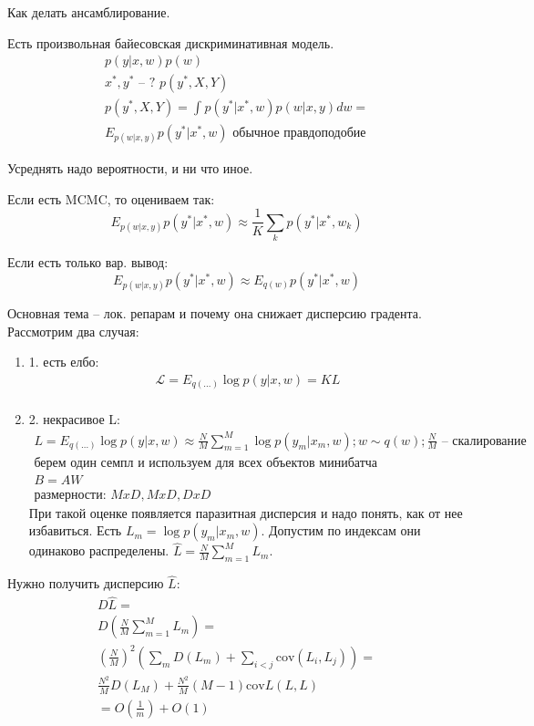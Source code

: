 \documentclass{minimal}
\begin{document}
Как делать ансамблирование.

Есть произвольная байесовская дискриминативная модель.
\begin{gather*}
  p(y|x, w)p(w)\\
  x^*, y^* \textrm{ -- ? } p(y^*, X, Y)\\
  p(y^*, X, Y) = \int_{}^{} {p(y^*|x^*,w)p(w|x,y)dw}=\\
  E_{p(w|x, y)} p(y^*|x^*,w) \textrm{ обычное правдоподобие}
\end{gather*}

Усреднять надо вероятности, и ни что иное.

Если есть MCMC, то оцениваем так:
\[
  E_{p(w|x, y)} p(y^*|x^*,w) \approx \frac{1}{K}\sum_{k}^{} {p(y^*|x^*,w_k)}
\]

Если есть только вар. вывод:
\[
  E_{p(w|x, y)} p(y^*|x^*,w) \approx E_{q(w)} {p(y^*|x^*,w)}
\]

Основная тема -- лок. репарам и почему она снижает дисперсию градента.
Рассмотрим два случая:

\begin{enumerate}
  \item 1. есть елбо:
\begin{gather*}
  \mathcal{L}=E_{q(\dots)} \log p(y|x, w)=KL\\
\end{gather*}
\item 2. некрасивое L:
\begin{gather*}
  L=E_{q(\dots)} \log p(y|x, w) \approx \frac{N}{M} \sum_{m=1}^{M} {\log p(y_m|x_m,w)}; w \sim q(w); \textrm{$\frac{N}{M}$ -- скалирование}\\
  \textrm{берем один семпл и используем для всех объектов минибатча}\\
  B=AW\\
  \textrm{размерности: }MxD, MxD, DxD
\end{gather*}
При такой оценке появляется паразитная дисперсия и надо понять, как от нее избавиться. Есть $L_m=\log p(y_m|x_m, w)$. Допустим по индексам они одинаково распределены.  $\hat{L} = \frac{N}{M}\sum_{m=1}^{M} {L_m}$.
\end{enumerate}

Нужно получить дисперсию $\hat{L}$:
\begin{gather*}
  D\hat{L}=\\
  D\left(\frac{N}{M}\sum_{m=1}^{M} {L_m}\right)=\\
\left(\frac{N}{M}\right)^2\left(\sum_{m}^{} {D(L_m)+\sum_{i<j}^{} {\mathrm{cov}(L_i, L_j)}}\right)=\\
  \frac{N^2}{M}D(L_M)+\frac{N^2}{M}(M-1)\mathrm{cov}L(L, L)\\
=O\left(\frac{1}{m}\right)+O(1)
\end{gather*}
\end{document}

